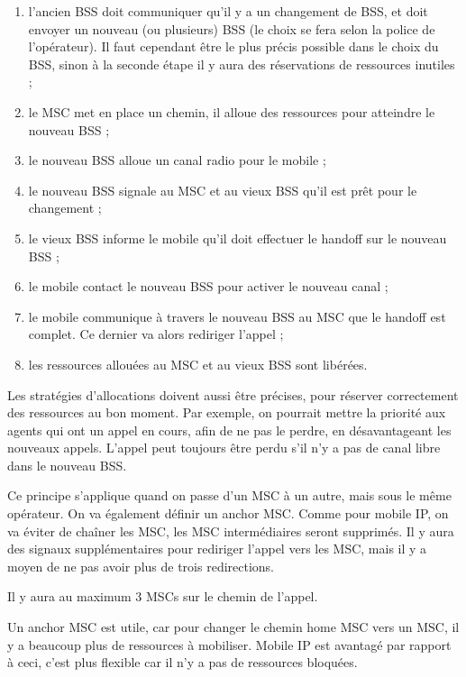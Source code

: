 	\begin{enumerate}
		\item l'ancien BSS doit communiquer qu'il y a un changement de BSS, et doit envoyer un nouveau (ou plusieurs) BSS (le choix se fera selon la police de l'opérateur). Il faut cependant être le plus précis possible dans le choix du BSS, sinon à la seconde étape il y aura des réservations de ressources inutiles ;
		\item le MSC met en place un chemin, il alloue des ressources pour atteindre le nouveau BSS ;
		\item le nouveau BSS alloue un canal radio pour le mobile ;
		\item le nouveau BSS signale au MSC et au vieux BSS qu'il est prêt pour le changement ;
		\item le vieux BSS informe le mobile qu'il doit effectuer le handoff sur le nouveau BSS ;
		\item le mobile contact le nouveau BSS pour activer le nouveau canal ;
		\item le mobile communique à travers le nouveau BSS au MSC que le handoff est complet. Ce dernier va alors rediriger l'appel ;
		\item les ressources allouées au MSC et au vieux BSS sont libérées.
	\end{enumerate}	
	
	Les stratégies d'allocations doivent aussi être précises, pour réserver correctement des ressources au bon moment. Par exemple, on pourrait mettre la priorité aux agents qui ont un appel en cours, afin de ne pas le perdre, en désavantageant les nouveaux appels. L'appel peut toujours être perdu s'il n'y a pas de canal libre dans le nouveau BSS.
		
	Ce principe s'applique quand on passe d'un MSC à un autre, mais sous le même opérateur. On va également définir un anchor MSC. Comme pour mobile IP, on va éviter de chaîner les MSC, les MSC intermédiaires seront supprimés. Il y aura des signaux supplémentaires pour rediriger l'appel vers les MSC, mais il y a moyen de ne pas avoir plus de trois redirections.
	
	
	Il y aura au maximum 3 MSCs sur le chemin de l'appel.
	
	Un anchor MSC est utile, car pour changer le chemin home MSC vers un MSC, il y a beaucoup plus de ressources à mobiliser. Mobile IP est avantagé par rapport à ceci, c'est plus flexible car il n'y a pas de ressources bloquées.
	
